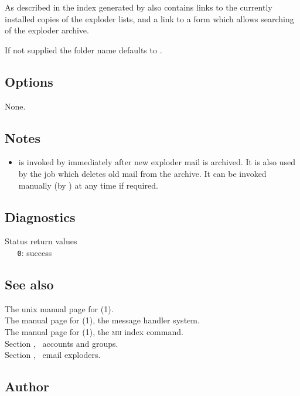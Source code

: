 As described in  the index generated by 
also contains links to the currently installed copies of the exploder lists,
and a link to a form which allows searching of the exploder archive.

If not supplied the folder name defaults to .

\subsection*{Options}

None.

\subsection*{Notes}

\begin{itemize}
\item
    is invoked by  immediately after new
   exploder mail is archived.  It is also used by the 
    job which deletes old mail from the
   \mbox{} archive.  It can be invoked manually (by
   ) at any time if required.
\end{itemize}

\subsection*{Diagnostics}

Status return values
\\ \verb+   0+: success

\subsection*{See also}

The unix manual page for (1).\\
The manual page for (1), the message handler system.\\
The manual page for (1), the \textsc{mh} index command.\\
Section , \aipspp\ accounts and groups.\\
Section , \aipspp\ email exploders.

\subsection*{Author}

